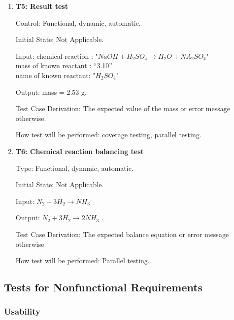 \documentclass[12pt, titlepage]{article}
\begin{document}
\begin{enumerate}

\item{\bf T5: Result test\\}

Control: Functional, dynamic, automatic.
					
Initial State: Not Applicable.
					
Input: chemical reaction : "$NaOH + H_2SO_4 \rightarrow H_2O + NA_2SO_4$"\\ mass
of known reactant : ``3.10''\\ name of known reactant: "$H_2SO_4$"
				
Output: mass = 2.53 g.

Test Case Derivation: The expected value of the mass or error message otherwise.
					
How test will be performed: coverage testing, parallel testing. 

\item{\bf T6: Chemical reaction balancing test\\}

Type: Functional, dynamic, automatic.
					
Initial State: Not Applicable.
					
Input: $ N_2 + 3H_2 \rightarrow NH_3 $
					
Output: $ N_2 + 3H_2 \rightarrow 2NH_3 $ .

Test Case Derivation: The expected balance equation or error message otherwise.

How test will be performed: Parallel testing.

\end{enumerate}


\subsection{Tests for Nonfunctional Requirements}

\subsubsection{Usability}		
\end{document}
